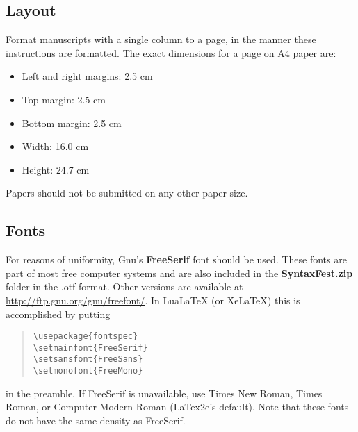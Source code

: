 \documentclass[11pt]{article}
\begin{document}
\subsection{Layout}
\label{ssec:layout}

Format manuscripts with a single column to a page, in the manner these instructions are formatted. The exact dimensions for a page on A4 paper are:

\begin{itemize}[label={\large\textbullet}]
\setlength{\itemsep}{0pt}
\setlength{\parsep}{0pt}
\setlength{\parskip}{0pt}
\item Left and right margins: 2.5 cm
\item Top margin: 2.5 cm
\item Bottom margin: 2.5 cm
\item Width: 16.0 cm
\item Height: 24.7 cm
\end{itemize}

\noindent Papers should not be submitted on any other paper size.


\subsection{Fonts}

For reasons of uniformity, Gnu's {\bf FreeSerif} font should be used. These fonts are part of most free computer systems and are also included in the {\bf SyntaxFest.zip} folder in the .otf format. Other versions are available at \url{http://ftp.gnu.org/gnu/freefont/}. 
In LuaLaTeX (or XeLaTeX) this is accomplished by putting

\begin{quote}
\begin{verbatim}
\usepackage{fontspec}
\setmainfont{FreeSerif}
\setsansfont{FreeSans}
\setmonofont{FreeMono}
\end{verbatim}
\end{quote}
in the preamble. If FreeSerif is unavailable, use Times New Roman, Times Roman, or Computer Modern Roman (LaTex2e's default). Note that these fonts do not have the same density as FreeSerif.
\end{document}
